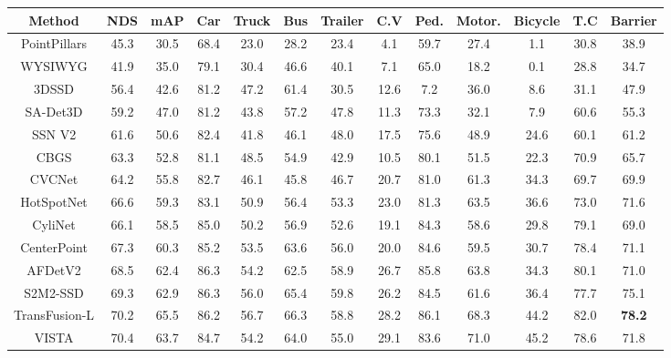 \documentclass[letterpaper]{article} \usepackage{aaai23}  \usepackage{times}  \usepackage{helvet}  \usepackage{courier}  \usepackage[hyphens]{url}  \usepackage{graphicx} \urlstyle{rm} \def\UrlFont{\rm}  \usepackage{natbib}  \usepackage{caption} \frenchspacing  \setlength{\pdfpagewidth}{8.5in} \usepackage{algorithm}
\begin{document}
\begin{table*}[t]
\begin{center}

\begin{adjustbox}{width=0.99\linewidth}

\begin{tabular}{c || C  C |  C  C  C  C  C  C  C  C  C  C }
\Xhline{4\arrayrulewidth}

Method & NDS & mAP & Car & Truck
& Bus & Trailer & C.V & Ped. & Motor. & Bicycle & T.C & Barrier \\ \hline\hline

PointPillars \cite{pointpillars} & 45.3 & 30.5 & 68.4 & 23.0 & 28.2 & 23.4 & 4.1 & 59.7 & 27.4 & 1.1 & 30.8 & 38.9\\
WYSIWYG \cite{wysiwyg} & 41.9 & 35.0 & 79.1 & 30.4 & 46.6 & 40.1 & 7.1 & 65.0 & 18.2 & 0.1 & 28.8 & 34.7\\
3DSSD \cite{3dssd} & 56.4 & 42.6 & 81.2 & 47.2 & 61.4 & 30.5 & 12.6 & 7.2 & 36.0 & 8.6 & 31.1 & 47.9\\
SA-Det3D \cite{sa-det3d} & 59.2 & 47.0 & 81.2 & 43.8 & 57.2 & 47.8 & 11.3 & 73.3 & 32.1 & 7.9 & 60.6 & 55.3\\
SSN V2 \cite{ssnV2} & 61.6 & 50.6 & 82.4 & 41.8 & 46.1 & 48.0 & 17.5 & 75.6 & 48.9 & 24.6 & 60.1 & 61.2\\
CBGS \cite{cbgs} & 63.3 & 52.8 & 81.1 & 48.5 & 54.9 & 42.9 & 10.5 & 80.1 & 51.5 & 22.3 & 70.9 & 65.7\\
CVCNet \cite{cvcnet} & 64.2 & 55.8 & 82.7 & 46.1 & 45.8 & 46.7 & 20.7 & 81.0 & 61.3 & 34.3 & 69.7 & 69.9\\
HotSpotNet \cite{hotspotnet} & 66.6 & 59.3 & 83.1 & 50.9 & 56.4 & 53.3 & 23.0 & 81.3 & 63.5 & 36.6 & 73.0 & 71.6\\
CyliNet \cite{cylinet} & 66.1 & 58.5 & 85.0 & 50.2 & 56.9 & 52.6 & 19.1 & 84.3 & 58.6 & 29.8 & 79.1 & 69.0\\
CenterPoint \cite{centerpoint} & 67.3 & 60.3 & 85.2 & 53.5 & 63.6 & 56.0 & 20.0 & 84.6 & 59.5 & 30.7 & 78.4 & 71.1\\
AFDetV2 \cite{afdetv2} & 68.5 & 62.4 & 86.3 & 54.2 & 62.5 & 58.9 & 26.7 & 85.8 & 63.8 & 34.3 & 80.1 & 71.0 \\
S2M2-SSD \cite{s2m2ssd} & 69.3 & 62.9 & 86.3 & 56.0 & 65.4 & 59.8 & 26.2 & 84.5 & 61.6 & 36.4 & 77.7 & 75.1\\
TransFusion-L \cite{transfusion} & 70.2 & 65.5 & 86.2 & 56.7 & 66.3 & 58.8 & 28.2 & 86.1 & 68.3 & 44.2 & 82.0 & \textbf{78.2}\\
VISTA \cite{vista} & 70.4 & 63.7 & 84.7 & 54.2 & 64.0 & 55.0 & 29.1 & 83.6 & 71.0 & 45.2 & 78.6 & 71.8\\


\end{tabular}
\end{adjustbox}
\end{center}
\end{table*}
\end{document}

